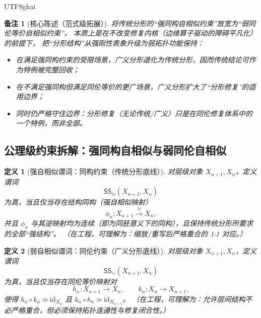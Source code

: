 \documentclass[12pt]{article}
\newtheorem{definition}{定义}[section]
\newtheorem{remark}{备注}[section]
\newcommand{\KouJing}{\texorpdfstring{表述约定}{表述约定}}
\begin{document}
\begin{CJK*}{UTF8}{gkai}
\begin{remark}[核心陈述（范式级拓展）]
将传统分形的“强同构自相似约束”放宽为“弱同伦等价自相似约束”，
本质上是在不改变修复内核（边缘算子驱动的障碍平凡化）的前提下，
把“分形结构”从\emph{强刚性表象}升级为\emph{弱拓扑功能保持}：
\begin{itemize}
  \item 在满足强同构约束的受限场景，广义分形退化为传统分形，因而传统结论可作为特例被完整回收；
  \item 在不满足强同构但满足同伦等价的更广场景，广义分形扩大了“分形修复”的适用边界；
  \item 同时仍严格守住边界：分形修复（无论传统/广义）只是在同伦修复体系中的一个特例，而非全部。
\end{itemize}
\end{remark}

\subsection{公理级约束拆解：强同构自相似与弱同伦自相似}
\label{subsec:tex29-strong-vs-weak-selfsimilarity}

\begin{definition}[强自相似谓词：同构约束（传统分形底线）]
对层级对象 $X_{n+1},X_n$，定义谓词
\[
  \mathsf{SS}_{\cong}(X_{n+1},X_n)
\]
为真，当且仅当存在结构同构（强自相似映射）
\[
  \phi_n:X_{n+1}\xrightarrow{\cong} X_n,
\]
并且 $\phi_n$ 与其逆映射均为连续（即为同胚意义下的同构），且保持传统分形所要求的全部“强结构”。
（在工程，可理解为：缩放/重写后\emph{严格重合}的 1:1 对应。）
\end{definition}

\begin{definition}[弱自相似谓词：同伦约束（广义分形底线）]
对层级对象 $X_{n+1},X_n$，定义谓词
\[
  \mathsf{SS}_{\simeq}(X_{n+1},X_n)
\]
为真，当且仅当存在同伦等价映射对
\[
  h_n:X_{n+1}\to X_n,\qquad k_n:X_n\to X_{n+1},
\]
使得 $h_n\circ k_n\simeq \mathrm{id}_{X_n}$ 且 $k_n\circ h_n\simeq \mathrm{id}_{X_{n+1}}$。
（在工程，可理解为：允许层间结构\emph{不必严格重合}，但必须保持拓扑连通性与修复闭合性。）
\end{definition}


\end{CJK*}
\end{document}
